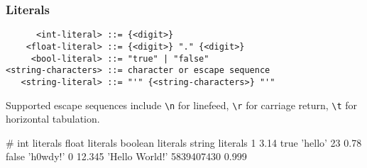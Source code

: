 \subsubsection{Literals}
\begin{verbatim}
      <int-literal> ::= {<digit>}
    <float-literal> ::= {<digit>} "." {<digit>}
     <bool-literal> ::= "true" | "false"
<string-characters> ::= character or escape sequence
   <string-literal> ::= "'" {<string-characters>} "'"
\end{verbatim}

\noindent
Supported escape sequences include \verb|\n| for linefeed, \verb|\r| for carriage return,
\verb|\t| for horizontal tabulation.

\begin{mylisting}
# int literals     float literals     boolean literals       string literals
1                  3.14               true                   'hello'
23                 0.78               false                  'h0wdy!'
0                  12.345                                    'Hello World!\n'
5839407430         0.999
\end{mylisting}
